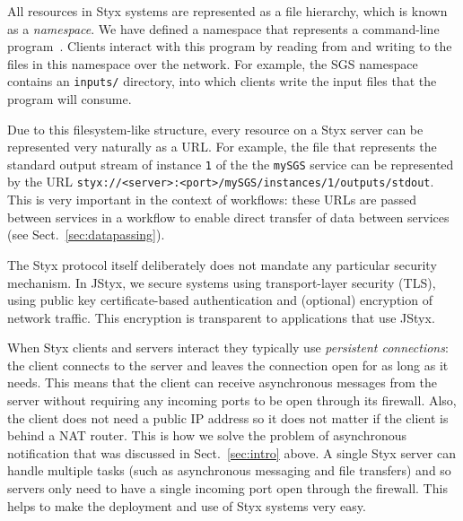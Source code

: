 \documentclass{article}
\begin{document}
All resources in Styx systems are represented as a file hierarchy, which is known as a {\em namespace\/}.  We have defined a namespace that represents a command-line program~\cite{blower:2005}.  Clients interact with this program by reading from and writing to the files in this namespace over the network.  For example, the SGS namespace contains an {\tt inputs/} directory, into which clients write the input files that the program will consume. 

Due to this filesystem-like structure, every resource on a Styx server can be represented very naturally as a URL.  For example, the file that represents the standard output stream of instance {\tt 1} of the the {\tt mySGS} service can be represented by the URL {\tt styx://<server>:<port>/mySGS/instances/1/outputs/stdout}.  This is very important in the context of workflows: these URLs are passed between services in a workflow to enable direct transfer of data between services (see Sect.~\ref{sec:datapassing}).

The Styx protocol itself deliberately does not mandate any particular security mechanism.  In JStyx, we secure systems using transport-layer security (TLS), using public key certificate-based authentication and (optional) encryption of network traffic.  This encryption is transparent to applications that use JStyx.

When Styx clients and servers interact they typically use {\em persistent connections\/}: the client connects to the server and leaves the connection open for as long as it needs.  This means that the client can receive asynchronous messages from the server without requiring any incoming ports to be open through its firewall.  Also, the client does not need a public IP address so it does not matter if the client is behind a NAT router.  This is how we solve the problem of asynchronous notification that was discussed in Sect.~\ref{sec:intro} above.  A single Styx server can handle multiple tasks (such as asynchronous messaging and file transfers) and so servers only need to have a single incoming port open through the firewall.  This helps to make the deployment and use of Styx systems very easy.
\end{document}
